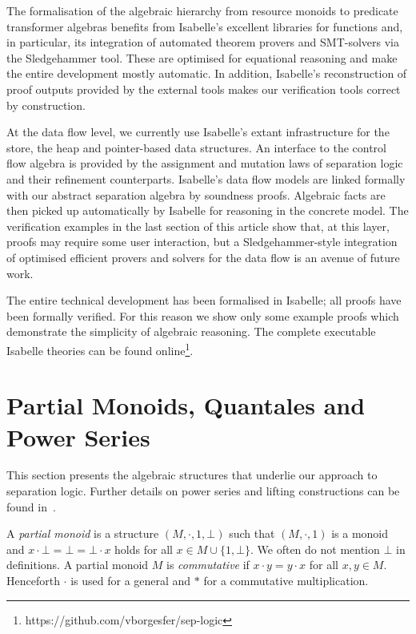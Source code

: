 \documentclass[twoside,runningheads,envcountsame,envcountsect,oribibl,orivec]{llncs}
\begin{document}
The formalisation of the algebraic hierarchy from resource monoids to
predicate transformer algebras benefits from Isabelle's excellent
libraries for functions and, in particular, its integration of
automated theorem provers and SMT-solvers via the Sledgehammer tool.
These are optimised for equational reasoning and make the entire
development mostly automatic. In addition, Isabelle's reconstruction
of proof outputs provided by the external tools makes our verification
tools correct by construction.

At the data flow level, we currently use Isabelle's extant
infrastructure for the store, the heap and pointer-based data
structures. An interface to the control flow algebra is provided by
the assignment and mutation laws of separation logic and their
refinement counterparts. Isabelle's data flow models are linked
formally with our abstract separation algebra by soundness
proofs. Algebraic facts are then picked up automatically by Isabelle
for reasoning in the concrete model. The verification examples in the
last section of this article show that, at this layer, proofs may
require some user interaction, but a Sledgehammer-style integration of
optimised efficient provers and solvers for the data flow is an avenue
of future work.

The entire technical development has been formalised in Isabelle; all
proofs have been formally verified.  For this reason we show only some
example proofs which demonstrate the simplicity of algebraic
reasoning. The complete executable Isabelle theories can be found
online\footnote{https://github.com/vborgesfer/sep-logic}.



\section{Partial Monoids, Quantales and Power
  Series} \label{S:preliminaries}

This section presents the algebraic structures that underlie our
approach to separation logic. Further details on power series and
lifting constructions can be found in~\cite{DHS14}.

A \emph{partial monoid} is a structure $(M,\cdot,1,\bot)$ such that
$(M,\cdot,1)$ is a monoid and $x\cdot \bot =\bot = \bot \cdot x$ holds
for all $x \in M\cup\{1,\bot\}$.  We often do not mention $\bot$ in
definitions. A partial monoid $M$ is \emph{commutative} if $x\cdot
y=y\cdot x$ for all $x,y\in M$. Henceforth $\cdot$ is used for a
general and $\ast$ for a commutative multiplication.
\end{document}
